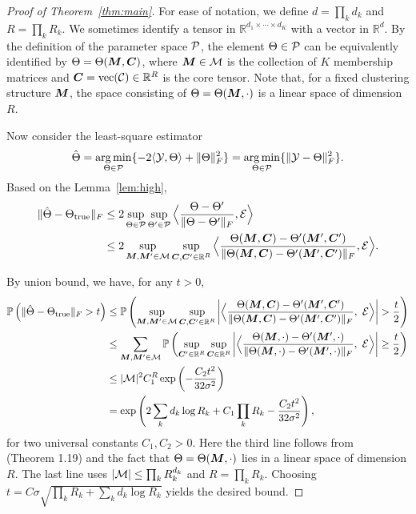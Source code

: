 \documentclass{article}
\begin{document}
\begin{appendices}
\begin{proof}[Proof of Theorem~\ref{thm:main}]
For ease of notation, we define $d=\prod_k d_k$ and $R=\prod_k R_k$. We sometimes identify a tensor in $\mathbb{R}^{d_1\times \cdots \times d_K}$ with a vector in $\mathbb{R}^d$. By the definition of the parameter space $\mathcal{P}$, the element $\Theta\in \mathcal{P}$ can be equivalently identified by $\Theta=\Theta(\bm M, \bm C)$, where $\bm M\in \mathcal{M}$ is the collection of $K$ membership matrices and $\bm C=\text{vec}(\mathcal{C})\in\mathbb{R}^R$ is the core tensor. Note that, for a fixed clustering structure $\bm M$, the space consisting of $\Theta=\Theta(\bm M,\cdot)$ is a linear space of dimension $R$. 




Now consider the least-square estimator
\[
\hat \Theta=\operatorname*{arg\,min}_{\Theta\in\mathcal{P}}\{-2\langle \mathcal{Y}, \Theta\rangle+\lVert\Theta\rVert_F^2 \}=\operatorname*{arg\,min}_{\Theta\in\mathcal{P}}\{\lVert\mathcal{Y}-\Theta\rVert_F^2 \}.
\]
Based on the Lemma~\ref{lem:high},
\begin{align}
\lVert\hat \Theta-\Theta_{\text{true}}\rVert_F&\leq 2\sup_{\Theta\in\mathcal{P}} \sup_{\Theta'\in \mathcal{P}} \Big\langle {\Theta-\Theta'\over \lVert\Theta-\Theta'\rVert_F}, \mathcal{E} \Big\rangle\\
&\leq 2\sup_{\bm M, \bm M' \in \mathcal{M}}\sup_{\bm C, \bm C' \in \mathbb{R}^R}\Big\langle {\Theta(\bm M, \bm C)-\Theta'(\bm M', \bm C')\over \lVert\Theta(\bm M, \bm C)-\Theta' (\bm M', \bm C')\rVert_F}, \mathcal{E} \Big\rangle.
\end{align}

By union bound, we have, for any $t>0$,
\begin{align}
\mathbb{P}\left(\FnormSize{}{\hat \Theta-\trueT} > t\right)&\leq \mathbb{P}\left(\sup_{\mM, \mM'\in \tM}\sup_{\mC, \mC'\in \mathbb{R}^R} \left|\Big\langle {\Theta(\mM,\mC)-\Theta'(\mM',\mC')\over \FnormSize{}{\Theta(\mM,\mC)-\Theta'(\mM',\mC')}}, \ \tE\Big\rangle\right|>{t\over 2}\right)\\
&\leq \sum_{\mM, \mM'\in \tM}\mathbb{P}\left(\sup_{\mC'\in \mathbb{R}^R}\sup_{\mC\in \mathbb{R}^R}\left|\Big\langle {\Theta(\mM,\cdot)-\Theta'(\mM',\cdot)\over \FnormSize{}{\Theta(\mM,\cdot)-\Theta'(\mM',\cdot)}},\ \tE\Big\rangle \right|\geq {t\over 2}\right)\\
&\leq |\tM|^2C_1^R\exp\left(-{C_2 t^2\over 32\sigma^2}\right)\\
&=\exp\left(2\sum_kd_k\log R_k+C_1\prod_k R_k-{C_2t^2\over 32\sigma^2}\right),
\end{align}
for two universal constants $C_1, C_2>0$. Here the third line follows from~\cite{rigollet2015high} (Theorem 1.19) and the fact that $\Theta=\Theta(\bm M,\cdot)$ lies in a linear space of dimension $R$. The last line uses $|\mathcal{M}|\leq \prod_k R_k^{d_k}$ and $R=\prod_k R_k$. Choosing $t=C\sigma\sqrt{\prod_k R_k+\sum_k d_k\log R_k}$ yields the desired bound. 
\end{proof}


\end{appendices}
\end{document}
